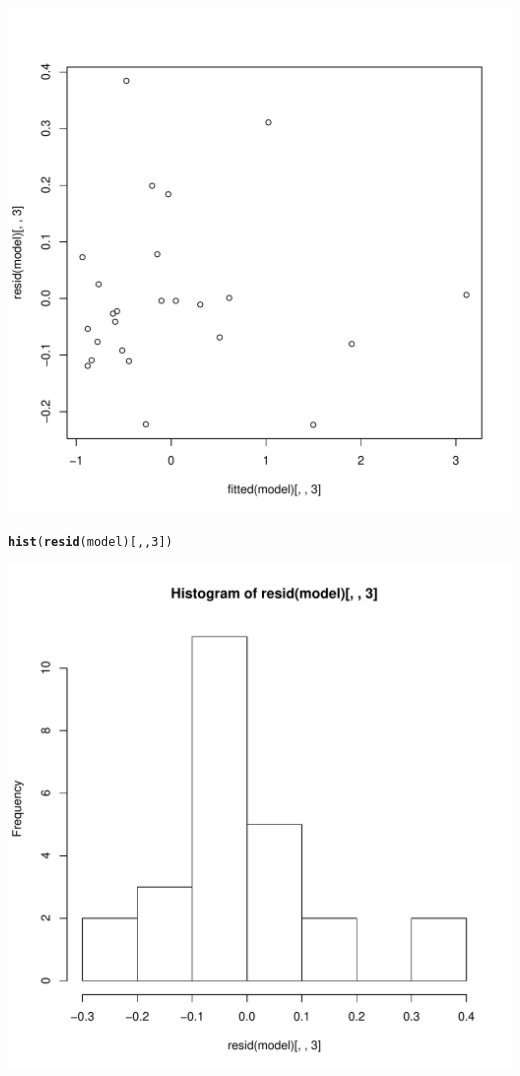 \documentclass{article}\usepackage[]{graphicx}\usepackage[]{color}
\makeatletter
\def\maxwidth{ %
  \ifdim\Gin@nat@width>\linewidth
    \linewidth
  \else
    \Gin@nat@width
  \fi
}
\newcommand{\hlnum}[1]{\textcolor[rgb]{0.686,0.059,0.569}{#1}}%
\newcommand{\hlstd}[1]{\textcolor[rgb]{0.345,0.345,0.345}{#1}}%
\newcommand{\hlkwd}[1]{\textcolor[rgb]{0.737,0.353,0.396}{\textbf{#1}}}%
\newenvironment{kframe}{%
 \def\at@end@of@kframe{}%
 \ifinner\ifhmode%
  \def\at@end@of@kframe{\end{minipage}}%
  \begin{minipage}{\columnwidth}%
 \fi\fi%
 \def\FrameCommand##1{\hskip\@totalleftmargin \hskip-\fboxsep
 \colorbox{shadecolor}{##1}\hskip-\fboxsep
     \hskip-\linewidth \hskip-\@totalleftmargin \hskip\columnwidth}%
 \MakeFramed {\advance\hsize-\width
   \@totalleftmargin\z@ \linewidth\hsize
   \@setminipage}}%
 {\par\unskip\endMakeFramed%
 \at@end@of@kframe}
\newenvironment{knitrout}{}{} %
\makeatother
\begin{document}
\begin{enumerate}[(a)]
\begin{knitrout}
\includegraphics[width=\maxwidth]{figure/unnamed-chunk-7-2} 
\begin{kframe}\begin{alltt}
  \hlkwd{hist}\hlstd{(}\hlkwd{resid}\hlstd{(model)[,,}\hlnum{3}\hlstd{])}
\end{alltt}
\end{kframe}
\includegraphics[width=\maxwidth]{figure/unnamed-chunk-7-3} 


\end{knitrout}
\end{enumerate}
\end{document}
